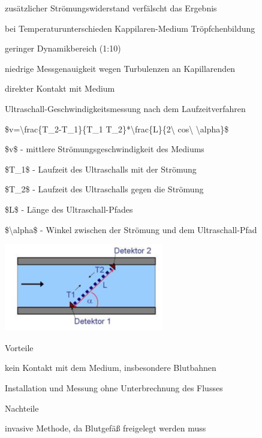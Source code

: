 \documentclass[a4paper]{article}
\begin{document}
\begin{multicols}{3}
\begin{itemize*}
    \begin{itemize*}
      \item zusätzlicher Strömungswiderstand verfälscht das Ergebnis
      \item bei Temperaturunterschieden Kappilaren-Medium Tröpfchenbildung
      \item geringer Dynamikbereich (1:10)
      \item niedrige Messgenauigkeit wegen Turbulenzen an Kapillarenden
      \item direkter Kontakt mit Medium
    \end{itemize*}
    \item Ultraschall-Geschwindigkeitsmessung nach dem Laufzeitverfahren
    \begin{itemize*}
      \item \$v=\textbackslash frac\{T\_2-T\_1\}\{T\_1 T\_2\}*\textbackslash frac\{L\}\{2\textbackslash{} cos\textbackslash{} \textbackslash alpha\}\$
      \item \$v\$ - mittlere Strömungsgeschwindigkeit des Mediums
      \item \$T\_1\$ - Laufzeit des Ultraschalls mit der Strömung
      \item \$T\_2\$ - Laufzeit des Ultraschalls gegen die Strömung
      \item \$L\$ - Länge des Ultraschall-Pfades
      \item \$\textbackslash alpha\$ - Winkel zwischen der Strömung und dem Ultraschall-Pfad
      \item \includegraphics[width=.5\linewidth]{Assets/Biosignalverarbeitung-ultraschall-geschwindigkeit.png}
      \item Vorteile
      \begin{itemize*}
        \item kein Kontakt mit dem Medium, insbesondere Blutbahnen
        \item Installation und Messung ohne Unterbrechnung des Flusses
      \end{itemize*}
      \item Nachteile
      \begin{itemize*}
        \item invasive Methode, da Blutgefäß freigelegt werden muss

\end{itemize*}
\end{itemize*}
\end{itemize*}
\end{multicols}
\end{document}
